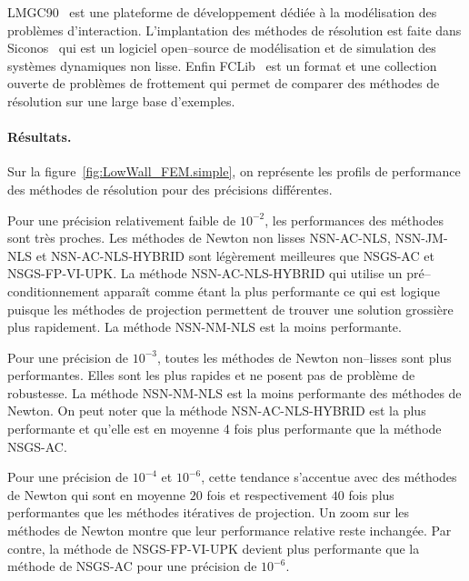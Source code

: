 \documentclass{CSMA2017}
\begin{document}
 LMGC90~\cite{dubois2003lmgc90} est une plateforme de d{\'e}veloppement d{\'e}di{\'e}e {\`a} la mod{\'e}lisation des probl{\`e}mes d’interaction. L'implantation des méthodes de résolution est faite dans Siconos~\cite{siconos} qui est un logiciel open--source de modélisation et de simulation des systèmes dynamiques non lisse.  Enfin FCLib~\cite{acary:hal-00945820} est un format et une collection ouverte de problèmes de frottement qui permet de comparer des méthodes de résolution sur une large base d'exemples.

\paragraph{Résultats.}
Sur la figure~\ref{fig:LowWall_FEM.simple}, on représente les profils de performance des méthodes de résolution pour des précisions différentes. 

Pour une précision relativement faible de $10^{-2}$, les performances des méthodes sont très proches. Les méthodes de Newton non lisses  {\sf\small NSN-AC-NLS}, {\sf\small NSN-JM-NLS} et {\sf\small NSN-AC-NLS-HYBRID} sont légèrement meilleures que {\sf\small NSGS-AC} et {\sf\small NSGS-FP-VI-UPK}. La méthode {\sf\small NSN-AC-NLS-HYBRID} qui utilise un pré--conditionnement apparaît comme étant la plus performante ce qui est logique puisque les méthodes de projection permettent de trouver une solution grossière plus rapidement. La méthode {\sf\small NSN-NM-NLS} est la moins performante.

Pour une précision de $10^{-3}$, toutes les méthodes de Newton non--lisses sont plus performantes. Elles sont les plus rapides et ne posent pas de problème de robustesse. La méthode {\sf\small NSN-NM-NLS} est la moins performante des méthodes de Newton. On peut noter que la méthode {\sf\small NSN-AC-NLS-HYBRID}  est la plus performante et qu'elle est en moyenne 4 fois plus performante que la méthode  {\sf\small NSGS-AC}. 

Pour une précision de  $10^{-4}$ et $10^{-6}$, cette tendance s'accentue avec des méthodes de Newton qui sont en moyenne $20$ fois et respectivement $40$ fois plus performantes que les méthodes itératives de projection. Un zoom sur les méthodes de Newton montre que leur performance relative reste inchangée. Par contre, la méthode de {\sf\small NSGS-FP-VI-UPK} devient plus performante que la méthode de {\sf\small NSGS-AC} pour une précision de $10^{-6}$.
\end{document}

